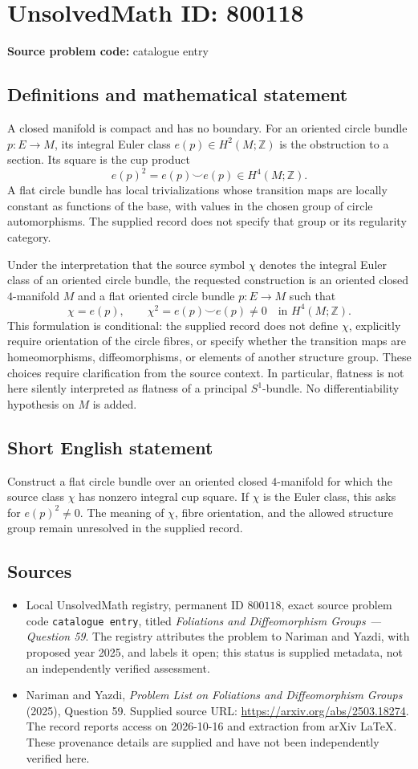 \documentclass[11pt]{article}
\newcommand{\Z}{\mathbb{Z}}
\begin{document}
\section*{UnsolvedMath ID: 800118}
\textbf{Source problem code:} catalogue entry
\subsection{Definitions and mathematical statement}
A closed manifold is compact and has no boundary. For an oriented circle bundle \(p\colon E\to M\), its integral Euler class \(e(p)\in H^2(M;\Z)\) is the obstruction to a section. Its square is the cup product
\[
e(p)^2=e(p)\smile e(p)\in H^4(M;\Z).
\]
A flat circle bundle has local trivializations whose transition maps are locally constant as functions of the base, with values in the chosen group of circle automorphisms. The supplied record does not specify that group or its regularity category.

Under the interpretation that the source symbol \(\chi\) denotes the integral Euler class of an oriented circle bundle, the requested construction is an oriented closed \(4\)-manifold \(M\) and a flat oriented circle bundle \(p\colon E\to M\) such that
\[
\chi=e(p),\qquad \chi^2=e(p)\smile e(p)\ne 0\quad\text{in }H^4(M;\Z).
\]
This formulation is conditional: the supplied record does not define \(\chi\), explicitly require orientation of the circle fibres, or specify whether the transition maps are homeomorphisms, diffeomorphisms, or elements of another structure group. These choices require clarification from the source context. In particular, flatness is not here silently interpreted as flatness of a principal \(S^1\)-bundle. No differentiability hypothesis on \(M\) is added.
\subsection{Short English statement}
Construct a flat circle bundle over an oriented closed \(4\)-manifold for which the source class \(\chi\) has nonzero integral cup square. If \(\chi\) is the Euler class, this asks for \(e(p)^2\ne0\). The meaning of \(\chi\), fibre orientation, and the allowed structure group remain unresolved in the supplied record.
\subsection{Sources}
\begin{itemize}
\item Local UnsolvedMath registry, permanent ID \(800118\), exact source problem code \texttt{catalogue entry}, titled \emph{Foliations and Diffeomorphism Groups --- Question 59}. The registry attributes the problem to Nariman and Yazdi, with proposed year 2025, and labels it open; this status is supplied metadata, not an independently verified assessment.
\item Nariman and Yazdi, \emph{Problem List on Foliations and Diffeomorphism Groups} (2025), Question 59. Supplied source URL: \url{https://arxiv.org/abs/2503.18274}. The record reports access on 2026-10-16 and extraction from arXiv LaTeX. These provenance details are supplied and have not been independently verified here.
\end{itemize}
\end{document}
